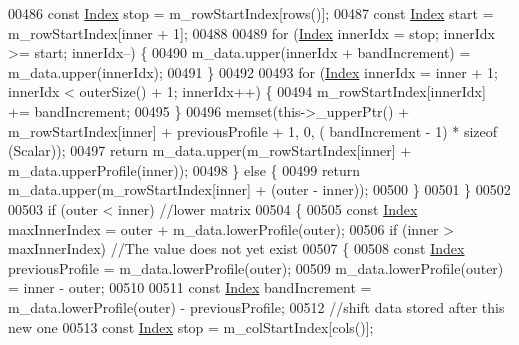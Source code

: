 \begin{DoxyCode}
00486                     \textcolor{keyword}{const} \hyperlink{group___core___module_a554f30542cc2316add4b1ea0a492ff02}{Index} stop = m\_rowStartIndex[rows()];
00487                     \textcolor{keyword}{const} \hyperlink{group___core___module_a554f30542cc2316add4b1ea0a492ff02}{Index} start = m\_rowStartIndex[inner + 1];
00488 
00489                     \textcolor{keywordflow}{for} (\hyperlink{group___core___module_a554f30542cc2316add4b1ea0a492ff02}{Index} innerIdx = stop; innerIdx >= start; innerIdx--) \{
00490                         m\_data.upper(innerIdx + bandIncrement) = m\_data.upper(innerIdx);
00491                     \}
00492 
00493                     \textcolor{keywordflow}{for} (\hyperlink{group___core___module_a554f30542cc2316add4b1ea0a492ff02}{Index} innerIdx = inner + 1; innerIdx < outerSize() + 1; innerIdx++) \{
00494                         m\_rowStartIndex[innerIdx] += bandIncrement;
00495                     \}
00496                     memset(this->\_upperPtr() + m\_rowStartIndex[inner] + previousProfile + 1, 0, (
      bandIncrement - 1) * \textcolor{keyword}{sizeof} (Scalar));
00497                     \textcolor{keywordflow}{return} m\_data.upper(m\_rowStartIndex[inner] + m\_data.upperProfile(inner));
00498                 \} \textcolor{keywordflow}{else} \{
00499                     \textcolor{keywordflow}{return} m\_data.upper(m\_rowStartIndex[inner] + (outer - inner));
00500                 \}
00501             \}
00502 
00503             \textcolor{keywordflow}{if} (outer < inner) \textcolor{comment}{//lower matrix}
00504             \{
00505                 \textcolor{keyword}{const} \hyperlink{group___core___module_a554f30542cc2316add4b1ea0a492ff02}{Index} maxInnerIndex = outer + m\_data.lowerProfile(outer);
00506                 \textcolor{keywordflow}{if} (inner > maxInnerIndex) \textcolor{comment}{//The value does not yet exist}
00507                 \{
00508                     \textcolor{keyword}{const} \hyperlink{group___core___module_a554f30542cc2316add4b1ea0a492ff02}{Index} previousProfile = m\_data.lowerProfile(outer);
00509                     m\_data.lowerProfile(outer) = inner - outer;
00510 
00511                     \textcolor{keyword}{const} \hyperlink{group___core___module_a554f30542cc2316add4b1ea0a492ff02}{Index} bandIncrement = m\_data.lowerProfile(outer) - previousProfile;
00512                     \textcolor{comment}{//shift data stored after this new one}
00513                     \textcolor{keyword}{const} \hyperlink{group___core___module_a554f30542cc2316add4b1ea0a492ff02}{Index} stop = m\_colStartIndex[cols()];

\end{DoxyCode}
